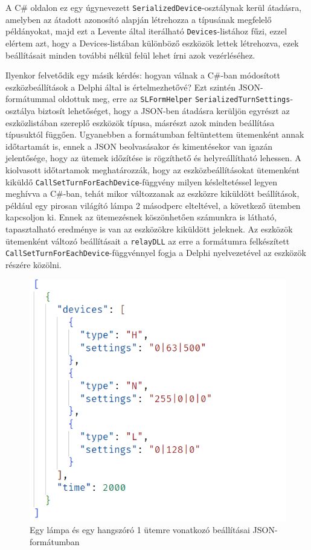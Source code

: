 \documentclass[tocnopagenum]{thesis-ekf}
\begin{document}
		A C\# oldalon ez egy úgynevezett \verb*|SerializedDevice|-osztálynak kerül átadásra, amelyben az átadott azonosító alapján létrehozza a típusának megfelelő példányokat, majd ezt a Levente által iterálható \verb*|Devices|-listához fűzi, ezzel elértem azt, hogy a Devices-listában különböző eszközök lettek létrehozva, ezek beállításait minden további nélkül felül lehet írni azok vezérléséhez.
	
		Ilyenkor felvetődik egy másik kérdés: hogyan válnak a C\#-ban módosított eszközbeállítások a Delphi által is értelmezhetővé? Ezt szintén JSON-formátummal oldottuk meg, erre az \verb*|SLFormHelper| \verb*|SerializedTurnSettings|-osztálya biztosít lehetőséget, hogy a JSON-ben átadásra kerüljön egyrészt az eszközlistában szereplő eszközök típusa, másrészt azok minden beállítása típusuktól függően. Ugyanebben a formátumban feltüntettem ütemenként annak időtartamát is, ennek a JSON beolvasásakor és kimentésekor van igazán jelentősége, hogy az ütemek időzítése is rögzíthető és helyreállítható lehessen. A kiolvasott időtartamok meghatározzák, hogy az eszközbeállításokat ütemenként kiküldő \verb*|CallSetTurnForEachDevice|-függvény milyen késleltetéssel legyen meghívva a C\#-ban, tehát mikor változzanak az eszközre kiküldött beállítások, például egy pirosan világító lámpa 2 másodperc elteltével, a következő ütemben kapcsoljon ki. Ennek az ütemezésnek köszönhetően számunkra is látható, tapasztalható eredménye is van az eszközökre kiküldött jeleknek.
		Az eszközök ütemenként változó beállításait a \verb*|relayDLL| az erre a formátumra felkészített \verb*|CallSetTurnForEachDevice|-függvénnyel fogja a Delphi nyelvezetével az eszközök részére közölni.
	\begin{figure}[h!]
		\centering
		\includegraphics[scale=0.55]{images/json_szerializalas_utemek.PNG}
		\caption{Egy lámpa és egy hangszóró 1 ütemre vonatkozó beállításai JSON-formátumban}
		\label{fig:json_settings}
	\end{figure}	
	
\end{document}
